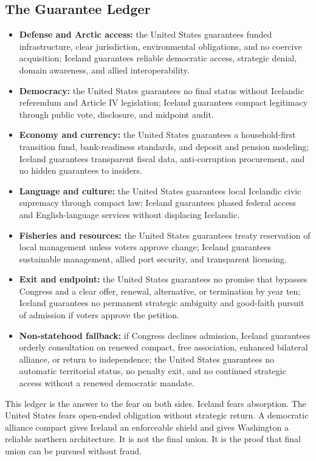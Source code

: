 \documentclass[11pt,a4paper]{article}
\begin{document}
\subsection{The Guarantee Ledger}
\begin{itemize}
  \item \textbf{Defense and Arctic access:} the United States guarantees funded infrastructure, clear jurisdiction, environmental obligations, and no coercive acquisition; Iceland guarantees reliable democratic access, strategic denial, domain awareness, and allied interoperability.
  \item \textbf{Democracy:} the United States guarantees no final status without Icelandic referendum and Article IV legislation; Iceland guarantees compact legitimacy through public vote, disclosure, and midpoint audit.
  \item \textbf{Economy and currency:} the United States guarantees a household-first transition fund, bank-readiness standards, and deposit and pension modeling; Iceland guarantees transparent fiscal data, anti-corruption procurement, and no hidden guarantees to insiders.
  \item \textbf{Language and culture:} the United States guarantees local Icelandic civic supremacy through compact law; Iceland guarantees phased federal access and English-language services without displacing Icelandic.
  \item \textbf{Fisheries and resources:} the United States guarantees treaty reservation of local management unless voters approve change; Iceland guarantees sustainable management, allied port security, and transparent licensing.
  \item \textbf{Exit and endpoint:} the United States guarantees no promise that bypasses Congress and a clear offer, renewal, alternative, or termination by year ten; Iceland guarantees no permanent strategic ambiguity and good-faith pursuit of admission if voters approve the petition.
  \item \textbf{Non-statehood fallback:} if Congress declines admission, Iceland guarantees orderly consultation on renewed compact, free association, enhanced bilateral alliance, or return to independence; the United States guarantees no automatic territorial status, no penalty exit, and no continued strategic access without a renewed democratic mandate.
\end{itemize}

This ledger is the answer to the fear on both sides. Iceland fears absorption. The United States fears open-ended obligation without strategic return. A democratic alliance compact gives Iceland an enforceable shield and gives Washington a reliable northern architecture. It is not the final union. It is the proof that final union can be pursued without fraud.
\end{document}
